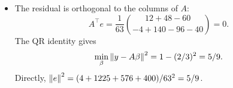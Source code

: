 \begin{example}
\begin{itemize}
\[  e=y-\hat y=\frac1{63}\begin{pmatrix}2\\35\\-24\\-20\end{pmatrix}.
  \]
\item The residual is orthogonal to the columns of \(A\):
  \[
  A^\top e=\frac1{63}\binom{12+48-60}{-4+140-96-40}=0.
  \]
  The QR identity gives
  \[
  \min_\beta\left\lVert y-A\beta\right\rVert^2=1-(2/3)^2=5/9.
  \]
  Directly, \(\left\lVert e\right\rVert^2=(4+1225+576+400)/63^2=5/9\).
\end{itemize}
\end{example}
